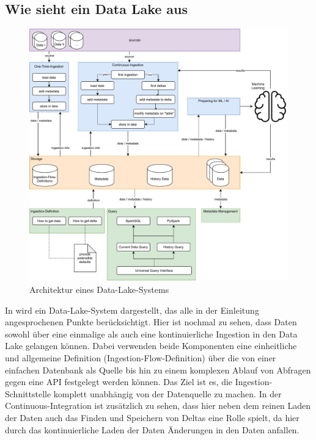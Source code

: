 \subsection{Wie sieht ein Data Lake aus}

\begin{figure}
    \begin{center}
        \includegraphics[width=\textwidth]{Grafiken/arch.pdf}
        \caption{Architektur eines Data-Lake-Systems}
        \label{fig:dl-arch}
    \end{center}
\end{figure}
In  wird ein Data-Lake-System dargestellt, das alle in der Einleitung angesprochenen Punkte berücksichtigt.
Hier ist nochmal zu sehen, dass Daten sowohl über eine einmalige als auch eine kontinuierliche Ingestion in den Data Lake gelangen können.
Dabei verwenden beide Komponenten eine einheitliche und allgemeine Definition (Ingestion-Flow-Definition) über die von einer einfachen Datenbank als Quelle bis hin zu einem komplexen Ablauf von Abfragen gegen eine API festgelegt werden können.
Das Ziel ist es, die Ingestion-Schnittstelle komplett unabhängig von der Datenquelle zu machen.
In der Continuous-Integration ist zusätzlich zu sehen, dass hier neben dem reinen Laden der Daten auch das Finden und Speichern von Deltas eine Rolle spielt, da hier durch das kontinuierliche Laden der Daten Änderungen in den Daten anfallen.

